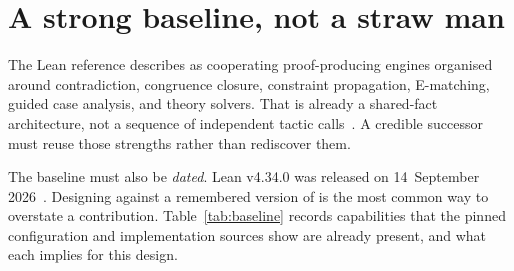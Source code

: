 \section{A strong baseline, not a straw man}
\label{sec:baseline}

The Lean reference describes \grind{} as cooperating proof-producing engines
organised around contradiction, congruence closure, constraint propagation,
E-matching, guided case analysis, and theory solvers. That is already a
shared-fact architecture, not a sequence of independent tactic
calls~\cite{grind-ref,grind-paper}. A credible successor must reuse those
strengths rather than rediscover them.

The baseline must also be \emph{dated}. Lean v4.34.0 was released on
14~September 2026~\cite{lean-release-434}. Designing against a remembered
version of \grind{} is the most common way to overstate a contribution.
Table~\ref{tab:baseline} records capabilities that the pinned configuration
and implementation sources show are already present, and what each implies for
this design.

